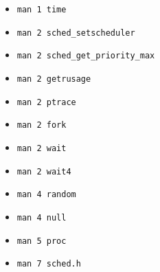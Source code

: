 \documentclass[12pt]{article}
\begin{document}
\begin{itemize}
\item \texttt{man 1 time}
\item \texttt{man 2 sched\_setscheduler}
\item \texttt{man 2 sched\_get\_priority\_max}
\item \texttt{man 2 getrusage}
\item \texttt{man 2 ptrace}
\item \texttt{man 2 fork}
\item \texttt{man 2 wait}
\item \texttt{man 2 wait4}
\item \texttt{man 4 random}
\item \texttt{man 4 null}
\item \texttt{man 5 proc}
\item \texttt{man 7 sched.h}
\end{itemize}
\end{document}
